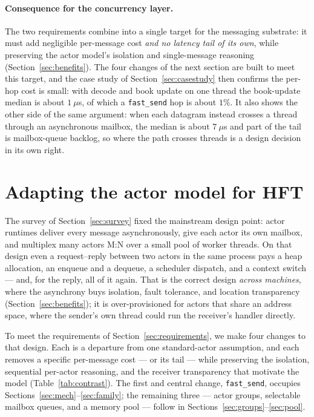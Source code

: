 \documentclass[11pt]{article}
\newcommand{\fs}{\texttt{fast\_send}}
\begin{document}
\paragraph{Consequence for the concurrency layer.} The two requirements combine
into a single target for the messaging substrate: it must add negligible
per-message cost \emph{and no latency tail of its own}, while preserving the
actor model's isolation and single-message reasoning
(Section~\ref{sec:benefits}). The four changes of the next section are built to
meet this target, and the case study of Section~\ref{sec:casestudy} then confirms
the per-hop cost is small: with decode and book update on one thread the
book-update median is about $1~\mu$s, of which a \fs{} hop is about $1\%$. It
also shows the other side of the same argument: when each datagram instead
crosses a thread through an asynchronous mailbox, the median is about $7~\mu$s and part of the tail is mailbox-queue
backlog, so where the path crosses threads is a design decision in its own right.

\section{Adapting the actor model for HFT}
\label{sec:extensions}

The survey of Section~\ref{sec:survey} fixed the mainstream design point:
actor runtimes deliver every message asynchronously, give each actor its own
mailbox, and multiplex many actors M:N over a small pool of worker threads. On
that design even a request--reply between two actors in the same process pays a
heap allocation, an enqueue and a dequeue, a scheduler dispatch, and a context
switch --- and, for the reply, all of it again. That is the correct design
\emph{across machines}, where the asynchrony buys isolation, fault tolerance,
and location transparency (Section~\ref{sec:benefits}); it is over-provisioned
for actors that share an address space, where the sender's own thread could run
the receiver's handler directly.

To meet the requirements of Section~\ref{sec:requirements}, we make four changes
to that design. Each is a departure from one standard-actor assumption, and each
removes a specific per-message cost --- or its tail --- while preserving the
isolation, sequential per-actor reasoning, and the receiver transparency that
motivate the model (Table~\ref{tab:contrast}). The first and central change, \fs{},
occupies Sections~\ref{sec:mech}--\ref{sec:family}; the remaining three ---
actor groups, selectable mailbox queues, and a memory pool --- follow in
Sections~\ref{sec:groups}--\ref{sec:pool}.
\end{document}
